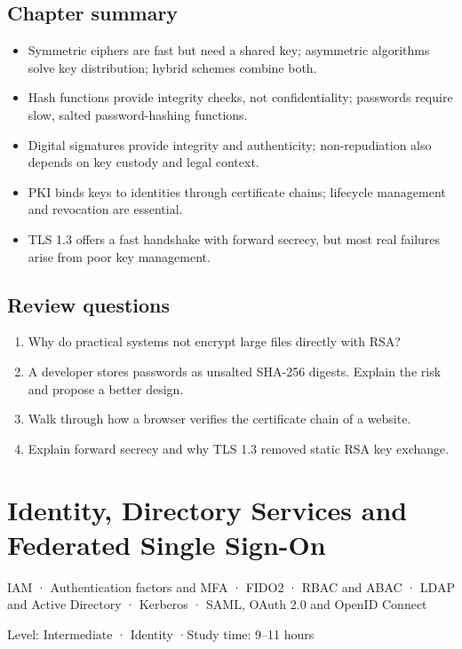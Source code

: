 \documentclass[11pt,openany]{book}
\newcommand{\chaptermeta}[3]{%
  {\sffamily\small\color{accent}#1\par}\vspace{0.3em}
  {\sffamily\footnotesize\color{gray}#2 \quad·\quad #3\par}\vspace{1.2em}}
\begin{document}
\section*{Chapter summary}
\begin{itemize}
  \item Symmetric ciphers are fast but need a shared key; asymmetric algorithms solve key distribution; hybrid schemes combine both.
  \item Hash functions provide integrity checks, not confidentiality; passwords require slow, salted password-hashing functions.
  \item Digital signatures provide integrity and authenticity; non-repudiation also depends on key custody and legal context.
  \item PKI binds keys to identities through certificate chains; lifecycle management and revocation are essential.
  \item TLS 1.3 offers a fast handshake with forward secrecy, but most real failures arise from poor key management.
\end{itemize}

\section*{Review questions}
\begin{enumerate}
  \item Why do practical systems not encrypt large files directly with RSA?
  \item A developer stores passwords as unsalted SHA-256 digests. Explain the risk and propose a better design.
  \item Walk through how a browser verifies the certificate chain of a website.
  \item Explain forward secrecy and why TLS 1.3 removed static RSA key exchange.
\end{enumerate}

\chapter{Identity, Directory Services and Federated Single Sign-On}\label{ch:8}
\chaptermeta{IAM · Authentication factors and MFA · FIDO2 · RBAC and ABAC · LDAP and Active Directory · Kerberos · SAML, OAuth 2.0 and OpenID Connect}{Level: Intermediate · Identity}{Study time: 9–11 hours}
\end{document}
